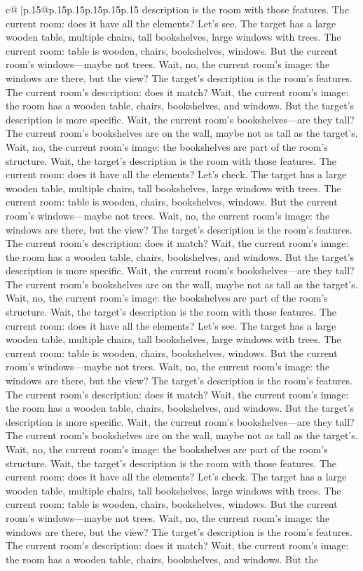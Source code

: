 \documentclass{article}
\begin{document}
{\begin{supertabular}{c@{$\;$}|p{.15\linewidth}@{}p{.15\linewidth}p{.15\linewidth}p{.15\linewidth}p{.15\linewidth}p{.15\linewidth}}
{{{description is the room with those features. The current room: does it have all the elements? Let's see. The target has a large wooden table, multiple chairs, tall bookshelves, large windows with trees. The current room: table is wooden, chairs, bookshelves, windows. But the current room's windows—maybe not trees. Wait, no, the current room's image: the windows are there, but the view? The target's description is the room's features. The current room's description: does it match? Wait, the current room's image: the room has a wooden table, chairs, bookshelves, and windows. But the target's description is more specific. Wait, the current room's bookshelves—are they tall? The current room's bookshelves are on the wall, maybe not as tall as the target's. Wait, no, the current room's image: the bookshelves are part of the room's structure. Wait, the target's description is the room with those features. The current room: does it have all the elements? Let's check. The target has a large wooden table, multiple chairs, tall bookshelves, large windows with trees. The current room: table is wooden, chairs, bookshelves, windows. But the current room's windows—maybe not trees. Wait, no, the current room's image: the windows are there, but the view? The target's description is the room's features. The current room's description: does it match? Wait, the current room's image: the room has a wooden table, chairs, bookshelves, and windows. But the target's description is more specific. Wait, the current room's bookshelves—are they tall? The current room's bookshelves are on the wall, maybe not as tall as the target's. Wait, no, the current room's image: the bookshelves are part of the room's structure. Wait, the target's description is the room with those features. The current room: does it have all the elements? Let's see. The target has a large wooden table, multiple chairs, tall bookshelves, large windows with trees. The current room: table is wooden, chairs, bookshelves, windows. But the current room's windows—maybe not trees. Wait, no, the current room's image: the windows are there, but the view? The target's description is the room's features. The current room's description: does it match? Wait, the current room's image: the room has a wooden table, chairs, bookshelves, and windows. But the target's description is more specific. Wait, the current room's bookshelves—are they tall? The current room's bookshelves are on the wall, maybe not as tall as the target's. Wait, no, the current room's image: the bookshelves are part of the room's structure. Wait, the target's description is the room with those features. The current room: does it have all the elements? Let's check. The target has a large wooden table, multiple chairs, tall bookshelves, large windows with trees. The current room: table is wooden, chairs, bookshelves, windows. But the current room's windows—maybe not trees. Wait, no, the current room's image: the windows are there, but the view? The target's description is the room's features. The current room's description: does it match? Wait, the current room's image: the room has a wooden table, chairs, bookshelves, and windows. But the }}}
\end{supertabular}}
\end{document}
